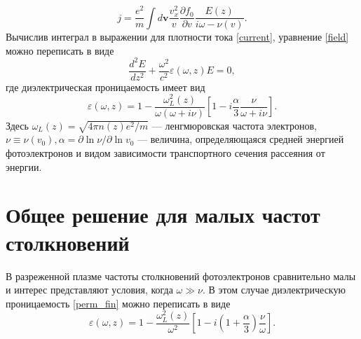 \documentclass[12pt,a4paper]{article}
\numberwithin{equation}{section}
\begin{document}
\begin{equation}
    \label{current}
    j = \frac{e^2}{m} \int d\bm{v} \frac{v_x^2}{v}\frac{\partial f_0}{\partial v} \frac{E\left(z\right)}{i\omega-\nu\left(v\right)}.
\end{equation}
Вычислив интеграл в выражении для плотности тока \eqref{current}, уравнение \eqref{field} можно переписать в виде
\begin{equation}
    \label{field2}
    \frac{d^2E}{dz^2}+\frac{\omega^2}{c^2}\varepsilon\left(\omega, z\right)E = 0,
\end{equation}
где диэлектрическая проницаемость имеет вид
\begin{equation}
    \label{perm_fin}
    \varepsilon(\omega, z)=1-\frac{\omega_L^2\left(z\right)}{\omega\left(\omega+i\nu\right) }\left[1-i\frac{\alpha}{3}\frac{\nu}{\omega+i\nu}\right].
\end{equation}
Здесь $\omega_L\left(z\right) = \sqrt{4\pi n\left(z\right)e^2/m}$ — ленгмюровская частота электронов, $\nu\equiv\nu\left(v_0\right),\alpha=\partial \ln\nu/\partial \ln v_0%
$ — величина, определяющаяся средней энергией фотоэлектронов и видом зависимости транспортного сечения рассеяния от энергии. %
\section{Общее решение для малых частот столкновений}
В разреженной плазме частоты столкновений фотоэлектронов сравнительно малы и интерес представляют условия, когда $\omega \gg \nu$. В этом случае
диэлектрическую проницаемость \eqref{perm_fin} можно переписать в виде
\begin{equation}
    \label{perm_nu}
    \varepsilon(\omega, z)=1-\frac{\omega_L^2\left(z\right)}{\omega^2}\left[1-i\left(1+\frac{\alpha}{3}\right)\frac{\nu}{\omega}\right].
\end{equation}
\end{document}
